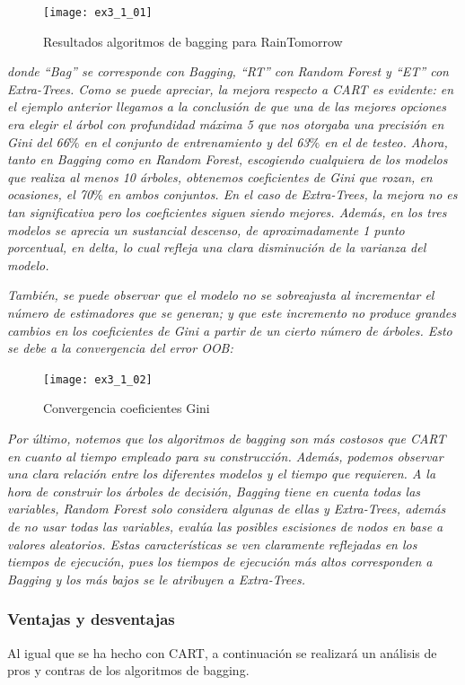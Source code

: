 \documentclass[12pt,twoside]{article}
\begin{document}
\begin{figure}[h]
\centering
\texttt{[image: ex3\_1\_01]}
\caption{Resultados algoritmos de bagging para RainTomorrow}
\end{figure}

\newpage
\noindent
\emph{donde ``Bag'' se corresponde con Bagging, ``RT'' con Random Forest y ``ET'' con Extra-Trees. Como se puede apreciar, la mejora respecto a CART es evidente: en el ejemplo anterior llegamos a la conclusión de que una de las mejores opciones era elegir el árbol con profundidad máxima 5 que nos otorgaba una precisión en Gini del 66$\%$ en el conjunto de entrenamiento y del 63$\%$ en el de testeo. Ahora, tanto en Bagging como en Random Forest, escogiendo cualquiera de los modelos que realiza al menos 10 árboles, obtenemos coeficientes de Gini que rozan, en ocasiones, el 70$\%$ en ambos conjuntos. En el caso de Extra-Trees, la mejora no es tan significativa pero los coeficientes siguen siendo mejores. Además, en los tres modelos se aprecia un sustancial descenso, de aproximadamente 1 punto porcentual, en delta, lo cual refleja una clara disminución de la varianza del modelo.}

\emph{También, se puede observar que el modelo no se sobreajusta al incrementar el número de estimadores que se generan; y que este incremento no produce grandes cambios en los coeficientes de Gini a partir de un cierto número de árboles. Esto se debe a la convergencia del error OOB:}


\begin{figure}[h]
\centering
\texttt{[image: ex3\_1\_02]}
\caption{Convergencia coeficientes Gini}
\end{figure}

\emph{Por último, notemos que los algoritmos de bagging son más costosos que CART en cuanto al tiempo empleado para su construcción. Además, podemos observar una clara relación entre los diferentes modelos y el tiempo que requieren. A la hora de construir los árboles de decisión, Bagging tiene en cuenta todas las variables, Random Forest solo considera algunas de ellas y Extra-Trees, además de no usar todas las variables, evalúa las posibles escisiones de nodos en base a valores aleatorios. Estas características se ven claramente reflejadas en los tiempos de ejecución, pues los tiempos de ejecución más altos corresponden a Bagging y los más bajos se le atribuyen a Extra-Trees.}


\subsubsection{Ventajas y desventajas}
Al igual que se ha hecho con CART, a continuación se realizará un análisis de pros y contras de los algoritmos de bagging.
\end{document}
